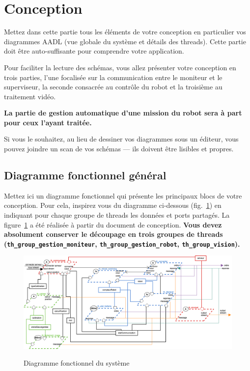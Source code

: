 \documentclass[11pt, a4paper]{paper}
\begin{document}
\newpage


\section{Conception}

{\color{red} Mettez dans cette partie tous les éléments de votre conception en particulier vos diagrammes AADL (vue globale du système et détails des threads). Cette partie doit être auto-suffisante pour comprendre votre application.

Pour faciliter la lecture des schémas, vous allez présenter votre conception en trois parties, l'une focalisée sur la communication entre le moniteur et le superviseur, la seconde consacrée au contrôle du robot et la troisième au traitement vidéo.

{\bf La partie de gestion automatique d'une mission du robot sera à part pour ceux l'ayant traitée.}

Si vous le souhaitez, au lieu de dessiner vos diagrammes sous un éditeur, vous pouvez joindre un scan de vos schémas — ils doivent être lisibles et propres.}

\subsection{Diagramme fonctionnel général}

{\color{red} Mettez ici un diagramme fonctionnel qui présente les principaux blocs de votre conception. Pour cela, inspirez vous du diagramme ci-dessous (fig.~\ref{fig:diag_fonc_gen}) en indiquant pour chaque groupe de threads les données et ports partagés. La figure~\ref{fig:diag_fonc_gen} a été réalisée à partir du document de conception. {\bf Vous devez absolument conserver le découpage en trois groupes de threads ({\tt th\_group\_gestion\_moniteur}, {\tt th\_group\_gestion\_robot}, {\tt th\_group\_vision}).}}

\begin{figure}[htbp]
\label{fig:diag_fonc_gen}
\begin{center}
{\includegraphics[scale=.4]{./figures/grosdiagramme}}
{\caption{Diagramme fonctionnel du système}}
\end{center}
\end{figure}
\FloatBarrier
\end{document}
